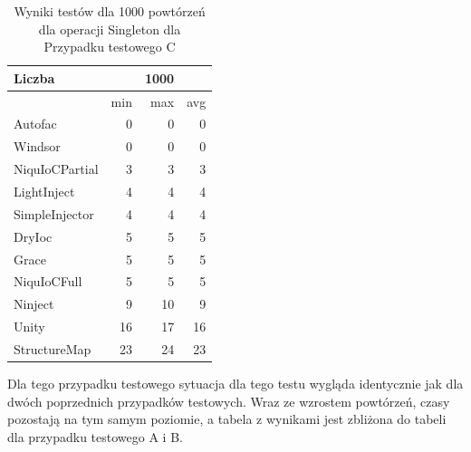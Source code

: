 \documentclass[12pt]{article}
\begin{document}
\begin{table}[H]
\captionsetup{belowskip=0pt,aboveskip=0pt}
\begin{center}
\begin{small}
	\begin{tabular}{ | l | r r r | }
    		\hline
Liczba & & 1000 & \\ \hline
 & min & max & avg \\ \hline
Autofac & 0 & 0 & 0 \\ \hline
Windsor & 0 & 0 & 0 \\ \hline
NiquIoCPartial & 3 & 3 & 3 \\ \hline
LightInject & 4 & 4 & 4 \\ \hline
SimpleInjector & 4 & 4 & 4 \\ \hline
DryIoc & 5 & 5 & 5 \\ \hline
Grace & 5 & 5 & 5 \\ \hline
NiquIoCFull & 5 & 5 & 5 \\ \hline
Ninject & 9 & 10 & 9 \\ \hline
Unity & 16 & 17 & 16 \\ \hline
StructureMap & 23 & 24 & 23 \\ \hline
  	\end{tabular}
\end{small}
\end{center}
\caption{Wyniki testów dla 1000 powtórzeń dla operacji Singleton dla Przypadku testowego C}
\label{TestCaseC_Singleton1000}
\end{table}
Dla tego przypadku testowego sytuacja dla tego testu wygląda identycznie jak dla dwóch poprzednich przypadków testowych. Wraz ze wzrostem powtórzeń, czasy pozostają na tym samym poziomie, a tabela z wynikami jest zbliżona do tabeli dla przypadku testowego A i B.
\end{document}
